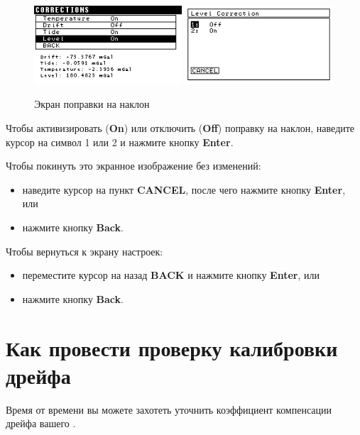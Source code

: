 \begin{figure}[H]
  \centering
  \includegraphics[width=0.49\textwidth]{figures/the_tilt_correction_screen_1}
  \includegraphics[width=0.49\textwidth]{figures/the_tilt_correction_screen_2}
  \caption{Экран поправки на наклон}
  \label{fig:the_tilt_correction_screen}
\end{figure}

Чтобы активизировать (\textbf{On}) или отключить (\textbf{Off}) поправку на
наклон, наведите курсор на символ 1 или 2 и нажмите кнопку \textbf{Enter}.

Чтобы покинуть это экранное изображение без изменений:
\begin{itemize}
  \item наведите курсор на пункт \textbf{CANCEL}, после чего нажмите кнопку
    \textbf{Enter}, или

  \item нажмите кнопку \textbf{Back}.
\end{itemize}

Чтобы вернуться к экрану настроек:
\begin{itemize}
  \item переместите курсор на назад \textbf{BACK} и нажмите кнопку
    \textbf{Enter}, или

  \item нажмите кнопку \textbf{Back}.
\end{itemize}

\section{Как провести проверку калибровки дрейфа}

Время от времени вы можете захотеть уточнить коэффициент компенсации дрейфа
вашего \cg{}.

